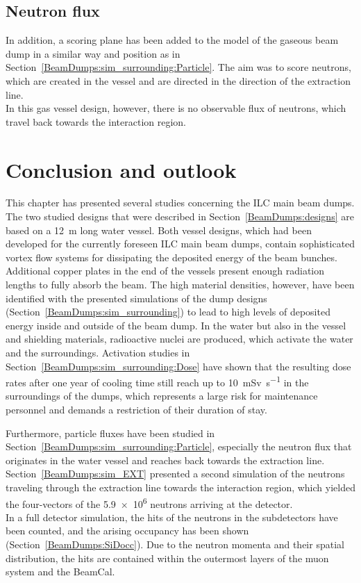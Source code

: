 \subsection{Neutron flux}
In addition, a scoring plane has been added to the \fluka model of the gaseous beam dump in a similar way and position as in Section~\ref{BeamDumps:sim_surrounding:Particle}.
The aim was to score neutrons, which are created in the vessel and are directed in the direction of the extraction line.
\\In this gas vessel design, however, there is no observable flux of neutrons, which travel back towards the interaction region.

\section{Conclusion and outlook}
This chapter has presented several studies concerning the ILC main beam dumps.
The two studied designs that were described in Section~\ref{BeamDumps:designs} are based on a \SI{12}{\meter} long water vessel.
Both vessel designs, which had been developed for the currently foreseen ILC main beam dumps, contain sophisticated vortex flow systems for dissipating the deposited energy of the beam bunches.
Additional copper plates in the end of the vessels present enough radiation lengths to fully absorb the beam.
The high material densities, however, have been identified with the presented \fluka simulations of the dump designs (Section~\ref{BeamDumps:sim_surrounding}) to lead to high levels of deposited energy inside and outside of the beam dump.
In the water but also in the vessel and shielding materials, radioactive nuclei are produced, which activate the water and the surroundings.
Activation studies in Section~\ref{BeamDumps:sim_surrounding:Dose} have shown that the resulting dose rates after one year of cooling time still reach up to \SI{10}{\milli\sievert\per\second} in the surroundings of the dumps, which represents a large risk for maintenance personnel and demands a restriction of their duration of stay.

Furthermore, particle fluxes have been studied in Section~\ref{BeamDumps:sim_surrounding:Particle}, especially the neutron flux that originates in the water vessel and reaches back towards the extraction line.
Section~\ref{BeamDumps:sim_EXT} presented a second \fluka simulation of the neutrons traveling through the extraction line towards the interaction region, which yielded the four-vectors of the \num{5.9e6} neutrons arriving at the \sid detector.
\\In a full \geant detector simulation, the hits of the neutrons in the \sid subdetectors have been counted, and the arising occupancy has been shown (Section~\ref{BeamDumps:SiDocc}).
Due to the neutron momenta and their spatial distribution, the hits are contained within the outermost layers of the \sid muon system and the BeamCal.

